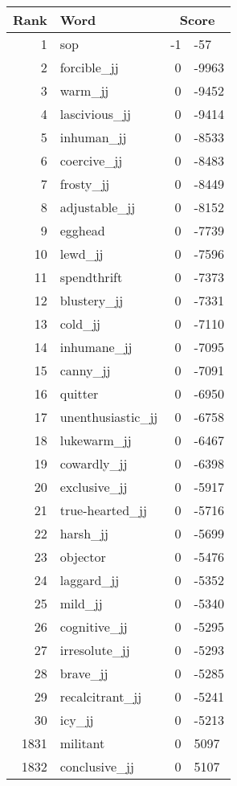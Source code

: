 \begin{longtable}[!htbp]{| rlr@{.}l |}
    \hline
    \textbf{Rank} & \textbf{Word} & \multicolumn{2}{c|}{\textbf{Score}} \\
    \hline
    \endhead
    1 & sop & -1 & -57 \\
    2 & forcible\_jj & 0 & -9963 \\
    3 & warm\_jj & 0 & -9452 \\
    4 & lascivious\_jj & 0 & -9414 \\
    5 & inhuman\_jj & 0 & -8533 \\
    6 & coercive\_jj & 0 & -8483 \\
    7 & frosty\_jj & 0 & -8449 \\
    8 & adjustable\_jj & 0 & -8152 \\
    9 & egghead & 0 & -7739 \\
    10 & lewd\_jj & 0 & -7596 \\
    11 & spendthrift & 0 & -7373 \\
    12 & blustery\_jj & 0 & -7331 \\
    13 & cold\_jj & 0 & -7110 \\
    14 & inhumane\_jj & 0 & -7095 \\
    15 & canny\_jj & 0 & -7091 \\
    16 & quitter & 0 & -6950 \\
    17 & unenthusiastic\_jj & 0 & -6758 \\
    18 & lukewarm\_jj & 0 & -6467 \\
    19 & cowardly\_jj & 0 & -6398 \\
    20 & exclusive\_jj & 0 & -5917 \\
    21 & true-hearted\_jj & 0 & -5716 \\
    22 & harsh\_jj & 0 & -5699 \\
    23 & objector & 0 & -5476 \\
    24 & laggard\_jj & 0 & -5352 \\
    25 & mild\_jj & 0 & -5340 \\
    26 & cognitive\_jj & 0 & -5295 \\
    27 & irresolute\_jj & 0 & -5293 \\
    28 & brave\_jj & 0 & -5285 \\
    29 & recalcitrant\_jj & 0 & -5241 \\
    30 & icy\_jj & 0 & -5213 \\
    1831 & militant & 0 & 5097 \\
    1832 & conclusive\_jj & 0 & 5107 \\

\end{longtable}
